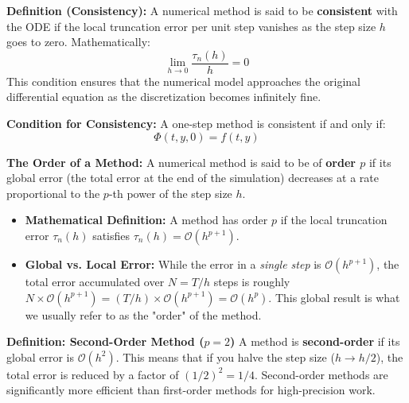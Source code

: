 \textbf{Definition (Consistency):} 
A numerical method is said to be \textbf{consistent} with the ODE if the local truncation error per unit step vanishes as the step size $h$ goes to zero. Mathematically:
\begin{equation}
    \lim_{h \to 0} \frac{\tau_n(h)}{h} = 0
\end{equation}
This condition ensures that the numerical model approaches the original differential equation as the discretization becomes infinitely fine.

\textbf{Condition for Consistency:} 
A one-step method is consistent if and only if:
\begin{equation}
    \Phi(t, y, 0) = f(t, y)
\end{equation}

\textbf{The Order of a Method:} 
A numerical method is said to be of \textbf{order $p$} if its global error (the total error at the end of the simulation) decreases at a rate proportional to the $p$-th power of the step size $h$. 

\begin{itemize}
    \item \textbf{Mathematical Definition:} A method has order $p$ if the local truncation error $\tau_n(h)$ satisfies $\tau_n(h) = \mathcal{O}(h^{p+1})$.
    \item \textbf{Global vs. Local Error:} While the error in a \textit{single step} is $\mathcal{O}(h^{p+1})$, the total error accumulated over $N = T/h$ steps is roughly $N \times \mathcal{O}(h^{p+1}) = (T/h) \times \mathcal{O}(h^{p+1}) = \mathcal{O}(h^p)$. This global result is what we usually refer to as the "order" of the method.
\end{itemize}

\textbf{Definition: Second-Order Method ($p=2$)}
A method is \textbf{second-order} if its global error is $\mathcal{O}(h^2)$. This means that if you halve the step size ($h \to h/2$), the total error is reduced by a factor of $(1/2)^2 = 1/4$. Second-order methods are significantly more efficient than first-order methods for high-precision work.

